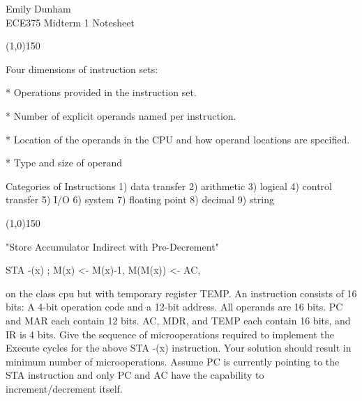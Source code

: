 \documentclass[8pt]{article}
\begin{document}
\begin{multicols}{3}
Emily Dunham\\
ECE375 Midterm 1 Notesheet

\line(1,0){150}

Four dimensions of instruction sets:                                            
                                                                                
* Operations provided in the instruction set.                                   
                                                                                
* Number of explicit operands named per instruction.                            
                                                                                
* Location of the operands in the CPU and how                                   
  operand locations are specified.                                              
                                                                                  
  * Type and size of operand                                                      
                                                                                  
  Categories of Instructions                                                      
  1) data transfer                                                                
  2) arithmetic                                                                   
  3) logical                                                                      
  4) control transfer                                                             
  5) I/O                                                                          
  6) system                                                                       
  7) floating point                                                               
  8) decimal                                                                      
  9) string 

\line(1,0){150}

"Store Accumulator Indirect with Pre-Decrement"

STA -(x) ; M(x) <- M(x)-1, M(M(x)) <- AC,

on the class cpu but with temporary register TEMP. An instruction consists of
16 bits: A 4-bit operation code and a 12-bit address. All operands are 16
bits. PC and MAR each contain 12 bits. AC, MDR, and TEMP each contain 16 bits,
and IR is 4 bits. Give the sequence of microoperations required to implement
the Execute cycles for the above STA -(x) instruction. Your solution should
result in minimum number of microoperations. Assume PC is currently pointing 
to the STA instruction and only PC and AC have the capability to 
increment/decrement itself. 


\end{multicols}
\end{document}

